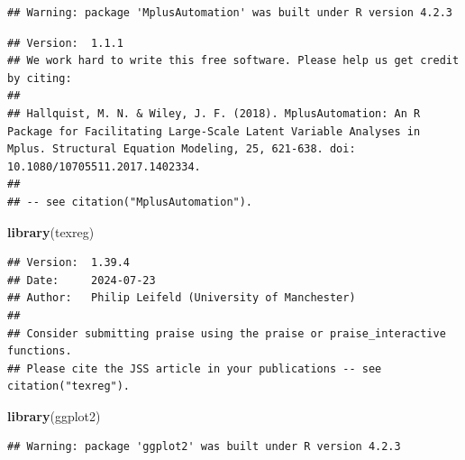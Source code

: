 \documentclass[
]{book}
\newenvironment{Shaded}{\begin{snugshade}}{\end{snugshade}}
\newcommand{\AttributeTok}[1]{\textcolor[rgb]{0.13,0.29,0.53}{#1}}
\newcommand{\CommentTok}[1]{\textcolor[rgb]{0.56,0.35,0.01}{\textit{#1}}}
\newcommand{\ConstantTok}[1]{\textcolor[rgb]{0.56,0.35,0.01}{#1}}
\newcommand{\DecValTok}[1]{\textcolor[rgb]{0.00,0.00,0.81}{#1}}
\newcommand{\FunctionTok}[1]{\textcolor[rgb]{0.13,0.29,0.53}{\textbf{#1}}}
\newcommand{\NormalTok}[1]{#1}
\newcommand{\OtherTok}[1]{\textcolor[rgb]{0.56,0.35,0.01}{#1}}
\newcommand{\SpecialCharTok}[1]{\textcolor[rgb]{0.81,0.36,0.00}{\textbf{#1}}}
\newcommand{\StringTok}[1]{\textcolor[rgb]{0.31,0.60,0.02}{#1}}
\begin{document}
\begin{verbatim}
## Warning: package 'MplusAutomation' was built under R version 4.2.3
\end{verbatim}

\begin{verbatim}
## Version:  1.1.1
## We work hard to write this free software. Please help us get credit by citing: 
## 
## Hallquist, M. N. & Wiley, J. F. (2018). MplusAutomation: An R Package for Facilitating Large-Scale Latent Variable Analyses in Mplus. Structural Equation Modeling, 25, 621-638. doi: 10.1080/10705511.2017.1402334.
## 
## -- see citation("MplusAutomation").
\end{verbatim}

\begin{Shaded}
\begin{Highlighting}[]
\FunctionTok{library}\NormalTok{(texreg)}
\end{Highlighting}
\end{Shaded}

\begin{verbatim}
## Version:  1.39.4
## Date:     2024-07-23
## Author:   Philip Leifeld (University of Manchester)
## 
## Consider submitting praise using the praise or praise_interactive functions.
## Please cite the JSS article in your publications -- see citation("texreg").
\end{verbatim}

\begin{Shaded}
\begin{Highlighting}[]
\FunctionTok{library}\NormalTok{(ggplot2)}
\end{Highlighting}
\end{Shaded}

\begin{verbatim}
## Warning: package 'ggplot2' was built under R version 4.2.3
\end{verbatim}

\begin{Shaded}
\end{Shaded}
\end{document}
